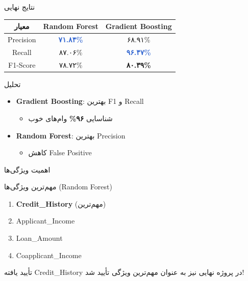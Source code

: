 \documentclass[aspectratio=169]{beamer}
\begin{document}
\begin{frame}{نتایج نهایی}
\begin{table}[h]
\centering
\small
\begin{tabular}{|c|c|c|}
\hline
\textbf{معیار} & \textbf{Random Forest} & \textbf{Gradient Boosting} \\
\hline
Precision & \textcolor{highlight}{\textbf{۷۱.۸۴\%}} & ۶۸.۹۱\% \\
\hline
Recall & ۸۷.۰۶\% & \textcolor{highlight}{\textbf{۹۶.۴۷\%}} \\
\hline
F1-Score & ۷۸.۷۲\% & \textcolor{important}{\textbf{۸۰.۳۹\%}} \\
\hline
\end{tabular}
\end{table}

\begin{block}{تحلیل}
\begin{itemize}
\item \textcolor{important}{\textbf{Gradient Boosting}}: بهترین F1 و Recall
\begin{itemize}
\item شناسایی \textbf{۹۶\%} وام‌های خوب
\end{itemize}
\item \textbf{Random Forest}: بهترین Precision
\begin{itemize}
\item کاهش False Positive
\end{itemize}
\end{itemize}
\end{block}
\end{frame}

\begin{frame}{اهمیت ویژگی‌ها}
\begin{block}{مهم‌ترین ویژگی‌ها (Random Forest)}
\begin{enumerate}
\item \textcolor{important}{\textbf{Credit\_History}} (مهم‌ترین)
\item Applicant\_Income
\item Loan\_Amount
\item Coapplicant\_Income
\end{enumerate}
\end{block}

\begin{alertblock}{تأیید یافته}
Credit\_History در پروژه نهایی نیز به عنوان مهم‌ترین ویژگی تأیید شد!
\end{alertblock}
\end{frame}
\end{document}
